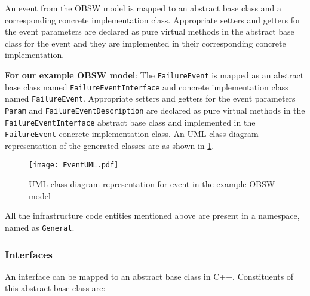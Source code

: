 An event from the OBSW model is mapped to an abstract base class and a corresponding concrete implementation class. Appropriate setters and getters for the event parameters are declared as pure virtual methods in the abstract base class for the event and they are implemented in their corresponding concrete implementation.

\textbf{For our example OBSW model}: The \texttt{FailureEvent} is mapped as an abstract base class named \texttt{FailureEvent\allowbreak Interface} and concrete implementation class named \texttt{FailureEvent}. Appropriate setters and getters for the event parameters \texttt{Param} and \texttt{Failure\allowbreak Event\allowbreak	Description} are declared as pure virtual methods in the \texttt{FailureEvent\allowbreak Interface} abstract base class and implemented in the \texttt{FailureEvent} concrete implementation class. An UML class diagram representation of the generated classes are as shown in \cref{fig: EventUML}.

\begin{figure}[h]
	\centering
	\texttt{[image: EventUML.pdf]}
	\caption{UML class diagram representation for event in the example OBSW model}
	\label{fig: EventUML}
\end{figure}    

All the infrastructure code entities mentioned above are present in a namespace, named as \texttt{General}.  

\subsubsection{\textbf{Interfaces}}
An interface can be mapped to an abstract base class in C++. Constituents of this abstract base class are:

